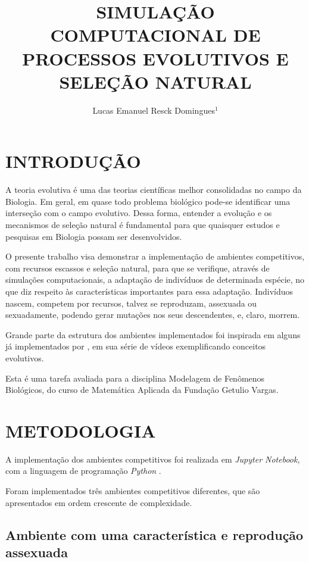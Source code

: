 \documentclass[10pt,brazil,english]{article}
\title{SIMULAÇÃO COMPUTACIONAL DE PROCESSOS EVOLUTIVOS E SELEÇÃO NATURAL}
\author{Lucas Emanuel Resck Domingues$^{1}$}
\begin{document}
    \pagestyle{fancy} %
    
    \maketitle
    \newpage
    
    \section{\uppercase{Introdução}}
    
        A teoria evolutiva é uma das teorias científicas melhor consolidadas no campo da Biologia. Em geral, em quase todo problema biológico pode-se identificar uma interseção com o campo evolutivo. Dessa forma, entender a evolução e os mecanismos de seleção natural é fundamental para que quaisquer estudos e pesquisas em Biologia possam ser desenvolvidos.
        
        O presente trabalho visa demonstrar a implementação de ambientes competitivos, com recursos escassos e seleção natural, para que se verifique, através de simulações computacionais, a adaptação de indivíduos de determinada espécie, no que diz respeito às características importantes para essa adaptação. Indivíduos nascem, competem por recursos, talvez se reproduzam, assexuada ou sexuadamente, podendo gerar mutações nos seus descendentes, e, claro, morrem.
        
        Grande parte da estrutura dos ambientes implementados foi inspirada em alguns já implementados por , em sua série de vídeos exemplificando conceitos evolutivos.
        
        Esta é uma tarefa avaliada para a disciplina Modelagem de Fenômenos Biológicos, do curso de Matemática Aplicada da Fundação Getulio Vargas.
    
    \section{\uppercase{Metodologia}}
    
        A implementação dos ambientes competitivos foi realizada em \textit{Jupyter Notebook}, com a linguagem de programação \textit{Python} \cite{Lucas2019}.
        
        Foram implementados três ambientes competitivos diferentes, que são apresentados em ordem crescente de complexidade.
        
            \subsection{Ambiente com uma característica e reprodução assexuada}
            
\end{document}
